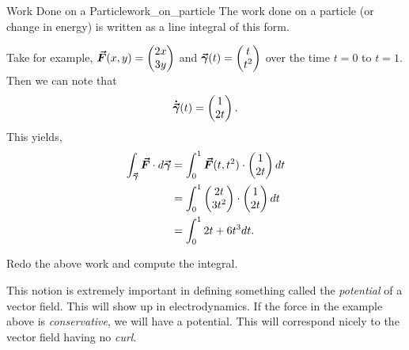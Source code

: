         \begin{ex}{Work Done on a Particle}{work_on_particle}
        The work done on a particle (or change in energy) is written as a line integral of this form.

        Take for example, $\boldsymbol{\vec{F}}(x,y)=\begin{pmatrix} 2x \\ 3y \end{pmatrix}$ and $\boldsymbol{\vec{\gamma}}(t)=\begin{pmatrix} t \\ t^2 \end{pmatrix}$ over the time $t=0$ to $t=1$.  Then we can note that
        \[
            \boldsymbol{\dot{\vec{\gamma}}}(t) = \begin{pmatrix} 1 \\ 2t \end{pmatrix}.
        \]
        This yields,
        \begin{align*}
        \int_{\boldsymbol{\vec{\gamma}}} \boldsymbol{\vec{F}} \cdot d\boldsymbol{\vec{\gamma}} &= \int_0^1 \boldsymbol{\vec{F}}(t,t^2)\cdot \begin{pmatrix} 1 \\ 2t \end{pmatrix} dt\\
        &= \int_0^1 \begin{pmatrix} 2t \\ 3t^2 \end{pmatrix} \cdot \begin{pmatrix} 1 \\ 2t \end{pmatrix}dt\\
        &=\int_0^1 2t+6t^3dt.
        \end{align*}
        \end{ex}

        \begin{exercise}
        	Redo the above work and compute the integral.
        \end{exercise}

        \begin{remark}
        This notion is extremely important in defining something called the \emph{potential} of a vector field.  This will show up in electrodynamics. If the force in the example above is \emph{conservative}, we will have a potential.  This will correspond nicely to the vector field having no \emph{curl}.
        \end{remark}





